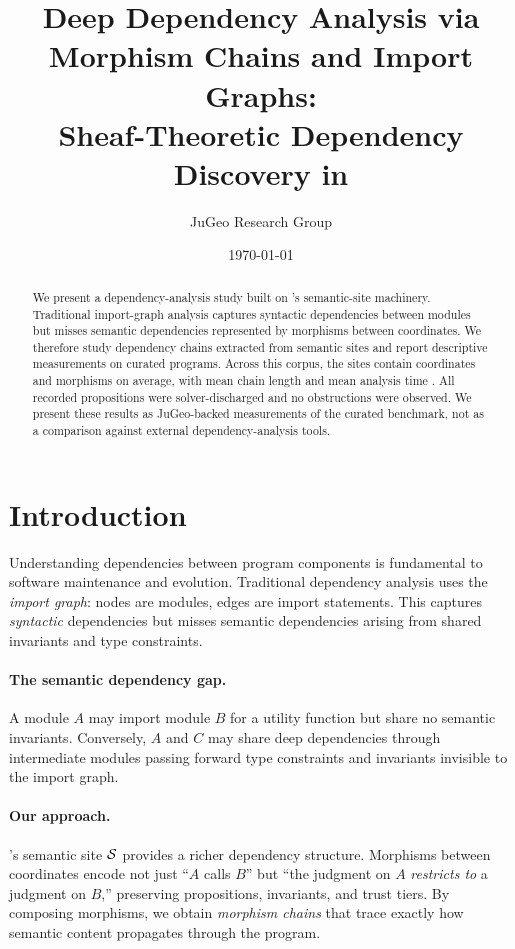 \documentclass[11pt]{article}
\title{\textbf{Deep Dependency Analysis via Morphism Chains and Import Graphs:\\
Sheaf-Theoretic Dependency Discovery in \JuGeo}}
\author{%
  JuGeo Research Group
}
\date{\today}
\begin{document}
\maketitle

\begin{abstract}
We present a dependency-analysis study built on \JuGeo's semantic-site
machinery. Traditional import-graph analysis captures syntactic dependencies
between modules but misses semantic dependencies represented by morphisms
between coordinates. We therefore study dependency chains extracted from
semantic sites and report descriptive measurements on
\ppLXIprogramCount{} curated programs. Across this corpus, the sites contain
\ppLXIcoordsMean{} coordinates and \ppLXImorphMean{} morphisms on average,
with mean chain length \ppLXIchainMean{} and mean analysis time
\ppLXItimeMean{}. All \ppLXIpropsOkSum{} recorded propositions were
solver-discharged and no obstructions were observed. We present these results
as JuGeo-backed measurements of the curated benchmark, not as a comparison
against external dependency-analysis tools.
\end{abstract}

\newpage

\section{Introduction}\label{sec:intro}

Understanding dependencies between program components is fundamental to
software maintenance and evolution.  Traditional dependency analysis uses the
\emph{import graph}: nodes are modules, edges are import statements.  This
captures \emph{syntactic} dependencies but misses semantic dependencies
arising from shared invariants and type constraints.

\paragraph{The semantic dependency gap.}
A module $A$ may import module $B$ for a utility function but share no
semantic invariants.  Conversely, $A$ and $C$ may share deep dependencies
through intermediate modules passing forward type constraints and invariants
invisible to the import graph.

\paragraph{Our approach.}
\JuGeo's semantic site $\mathcal{S}$ provides a richer dependency structure.
Morphisms between coordinates encode not just ``$A$ calls $B$'' but ``the
judgment on $A$ \emph{restricts to} a judgment on $B$,'' preserving
propositions, invariants, and trust tiers.  By composing morphisms, we
obtain \emph{morphism chains} that trace exactly how semantic content
propagates through the program.
\end{document}
